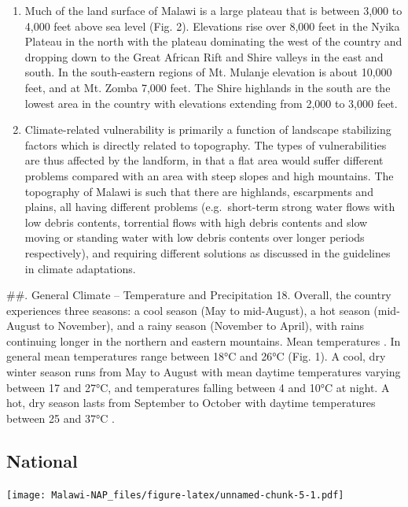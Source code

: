 \documentclass[
]{book}
\begin{document}
\begin{enumerate}
\def\labelenumi{\arabic{enumi}.}
\setcounter{enumi}{15}
\item
  Much of the land surface of Malawi is a large plateau that is between 3,000 to 4,000 feet above sea level (Fig. 2). Elevations rise over 8,000 feet in the Nyika Plateau in the north with the plateau dominating the west of the country and dropping down to the Great African Rift and Shire valleys in the east and south. In the south-eastern regions of Mt. Mulanje elevation is about 10,000 feet, and at Mt. Zomba 7,000 feet. The Shire highlands in the south are the lowest area in the country with elevations extending from 2,000 to 3,000 feet.
\item
  Climate-related vulnerability is primarily a function of landscape stabilizing factors which is directly related to topography. The types of vulnerabilities are thus affected by the landform, in that a flat area would suffer different problems compared with an area with steep slopes and high mountains. The topography of Malawi is such that there are highlands, escarpments and plains, all having different problems (e.g.~short-term strong water flows with low debris contents, torrential flows with high debris contents and slow moving or standing water with low debris contents over longer periods respectively), and requiring different solutions as discussed in the guidelines in climate adaptations.
\end{enumerate}

\#\#. General Climate -- Temperature and Precipitation
18. Overall, the country experiences three seasons: a cool season (May to mid-August), a hot season (mid-August to November), and a rainy season (November to April), with rains continuing longer in the northern and eastern mountains. Mean temperatures . In general mean temperatures range between 18°C and 26°C (Fig. 1). A cool, dry winter season runs from May to August with mean daytime temperatures varying between 17 and 27°C, and temperatures falling between 4 and 10°C at night. A hot, dry season lasts from September to October with daytime temperatures between 25 and 37°C .

\hypertarget{national}{%
\subsection{National}\label{national}}

\texttt{[image: Malawi-NAP\_files/figure-latex/unnamed-chunk-5-1.pdf]}
\end{document}
